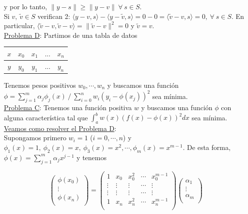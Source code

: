 y por lo tanto, $\|y - s\| \geq \|y - v\|\ \forall \ s \in S$.\\

Si $v,\ \tilde{v} \in S$ verifican 2: $\langle y - v, s \rangle - \langle y - \tilde{v}, s \rangle = 0 - 0 = \langle \tilde{v} - v, s \rangle = 0,\ \forall \ s \in S$. En particular, $\langle \tilde{v} - v, \tilde{v} - v \rangle = \|\tilde{v} - v\|^{2} = 0$ y $\tilde{v} = v$.\\

\newpage
\underline{Problema D}: Partimos de una tabla de datos

\begin{table}[ht]
    \centering
    \begin{tabular}{|c|c|c|c|c|}
        \hline
        $x$ & $x_{0}$ & $x_{1}$ & $...$ & $x_{n}$\\ \hline
        $y$ & $y_{0}$ & $y_{1}$ & $...$ & $y_{n}$\\ \hline
    \end{tabular}
\end{table}

Tenemos pesos positivos $w_{0}, \cdots, w_{n}$ y buscamos una funci\'on $\phi = \sum \limits_{j = 1}^{m} \alpha_{j}\phi_{j}(x)\ / \ \sum \limits_{i = 0}^{n} w_{i}(y_{i} - \phi(x_{j}))^{2}$ sea m\'inima.\\

\underline{Problema C}: Tenemos una funci\'on positiva $w$ y buscamos una funci\'on $\phi$ con alguna caracter\'istica tal que $\int_{a}^{b} w(x)(f(x) - \phi(x))^{2} dx$ sea m\'inima.\\

\underline{Veamos como resolver el Problema D}:\\

Supongamos primero $w_{i} = 1$ ($i = 0, \cdots, n$) y $\phi_{1}(x) = 1,\ \phi_{2}(x) = x,\ \phi_{3}(x) = x^{2}, \cdots, \phi_{m}(x) = x^{m - 1}$. De esta forma, $\phi(x) = \sum \limits_{j = 1}^{m} \alpha_{j}x^{j - 1}$ y tenemos

$$
	\begin{pmatrix}
        \phi(x_{0})\\
        \vdots\\
        \phi(x_{n})\\
    \end{pmatrix}
    =
    \begin{pmatrix}
        1 & x_{0} & x_{0}^{2} & \cdots & x_{0}^{m - 1}\\
        \vdots & \vdots & \vdots & \cdots & \vdots\\
        \vdots & \vdots & \vdots & \cdots & \vdots\\
        1 & x_{n} & x_{n}^{2} & \cdots & x_{n}^{m - 1}\\
    \end{pmatrix}
    \begin{pmatrix}
        \alpha_{1}\\
        \vdots\\
        \alpha_{m}\\
    \end{pmatrix}
$$\\

